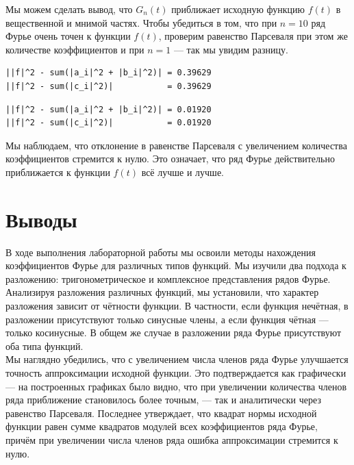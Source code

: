 \documentclass[a4paper]{article}
\begin{document}
Мы можем сделать вывод, что $G_n(t)$ приближает исходную функцию $f(t)$ в вещественной и мнимой частях. 
Чтобы убедиться в том, что при $n = 10$ ряд Фурье очень точен к функции $f(t)$, проверим равенство Парсеваля при этом же количестве коэффициентов и при $n = 1$ --- так мы увидим разницу.
\begin{minipage}{0.48\textwidth}
\begin{lstlisting}[caption={Равенство Парасеваля при $n=1$}]
||f|^2 - sum(|a_i|^2 + |b_i|^2)| = 0.39629
||f|^2 - sum(|c_i|^2)|           = 0.39629
\end{lstlisting}
\end{minipage}\hfill
\begin{minipage}{0.48\textwidth}
\begin{lstlisting}[caption={Равенство Парасеваля при $n=10$}, numbers=none]
||f|^2 - sum(|a_i|^2 + |b_i|^2)| = 0.01920
||f|^2 - sum(|c_i|^2)|           = 0.01920
\end{lstlisting}
\end{minipage}

Мы наблюдаем, что отклонение в равенстве Парсеваля с увеличением количества коэффициентов стремится к нулю. Это означает, что ряд Фурье действительно приближается к функции $f(t)$ всё лучше и лучше.
\section{Выводы}
В ходе выполнения лабораторной работы мы освоили методы нахождения коэффициентов Фурье для различных типов функций. Мы изучили два подхода к разложению: тригонометрическое и комплексное представления рядов Фурье.\\[0.5em]
Анализируя разложения различных функций, мы установили, что характер разложения зависит от чётности функции. В частности, если функция нечётная, в разложении присутствуют только синусные члены, а если функция чётная — только косинусные. В общем же случае в разложении ряда Фурье присутствуют оба типа функций.\\[0.5em]
Мы наглядно убедились, что с увеличением числа членов ряда Фурье улучшается точность аппроксимации исходной функции. Это подтверждается как графически — на построенных графиках было видно, что при увеличении количества членов ряда приближение становилось более точным, — так и аналитически через равенство Парсеваля. Последнее утверждает, что квадрат нормы исходной функции равен сумме квадратов модулей всех коэффициентов ряда Фурье, причём при увеличении числа членов ряда ошибка аппроксимации стремится к нулю.
\end{document}
